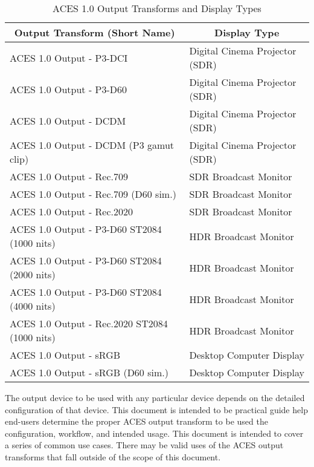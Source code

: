 \begin{table}[ht!]
\centering
\begin{tabular}{cc}
\textbf{Output Transform (Short Name)}                              & \textbf{Display Type}                               \\ \hline
\multicolumn{1}{|l|}{ACES 1.0 Output - P3-DCI}                      & \multicolumn{1}{l|}{Digital Cinema Projector (SDR)} \\ \hline
\multicolumn{1}{|l|}{ACES 1.0 Output - P3-D60}                      & \multicolumn{1}{l|}{Digital Cinema Projector (SDR)} \\ \hline
\multicolumn{1}{|l|}{ACES 1.0 Output - DCDM}                        & \multicolumn{1}{l|}{Digital Cinema Projector (SDR)} \\ \hline
\multicolumn{1}{|l|}{ACES 1.0 Output - DCDM (P3 gamut clip)}        & \multicolumn{1}{l|}{Digital Cinema Projector (SDR)} \\ \hline
\multicolumn{1}{|l|}{ACES 1.0 Output - Rec.709}                     & \multicolumn{1}{l|}{SDR Broadcast Monitor}          \\ \hline
\multicolumn{1}{|l|}{ACES 1.0 Output - Rec.709 (D60 sim.)}          & \multicolumn{1}{l|}{SDR Broadcast Monitor}          \\ \hline
\multicolumn{1}{|l|}{ACES 1.0 Output - Rec.2020}                    & \multicolumn{1}{l|}{SDR Broadcast Monitor}          \\ \hline
\multicolumn{1}{|l|}{ACES 1.0 Output - P3-D60 ST2084 (1000 nits)}   & \multicolumn{1}{l|}{HDR Broadcast Monitor}          \\ \hline
\multicolumn{1}{|l|}{ACES 1.0 Output - P3-D60 ST2084 (2000 nits)}   & \multicolumn{1}{l|}{HDR Broadcast Monitor}          \\ \hline
\multicolumn{1}{|l|}{ACES 1.0 Output - P3-D60 ST2084 (4000 nits)}   & \multicolumn{1}{l|}{HDR Broadcast Monitor}          \\ \hline
\multicolumn{1}{|l|}{ACES 1.0 Output - Rec.2020 ST2084 (1000 nits)} & \multicolumn{1}{l|}{HDR Broadcast Monitor}          \\ \hline
\multicolumn{1}{|l|}{ACES 1.0 Output - sRGB}                        & \multicolumn{1}{l|}{Desktop Computer Display}       \\ \hline
\multicolumn{1}{|l|}{ACES 1.0 Output - sRGB (D60 sim.)}             & \multicolumn{1}{l|}{Desktop Computer Display}       \\ \hline
\end{tabular}
\caption{ACES 1.0 Output Transforms and Display Types}
\label{odt-display-types-table}
\end{table}

The output device to be used with any particular device depends on the detailed configuration of that device.  This document is intended to be practical guide help end-users determine the proper ACES output transform to be used the configuration, workflow, and intended usage.  This document is intended to cover a series of common use cases.  There may be valid uses of the ACES output transforms that fall outside of the scope of this document.